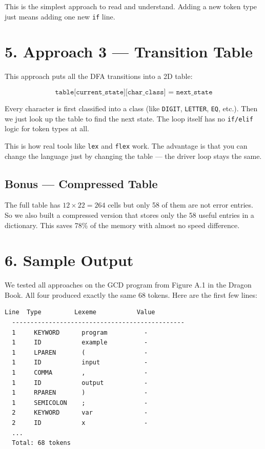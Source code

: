 \documentclass[12pt, a4paper]{article}
\begin{document}
This is the simplest approach to read and understand.
Adding a new token type just means adding one new \texttt{if} line.

\section*{5. Approach 3 — Transition Table}

This approach puts all the DFA transitions into a 2D table:

\[
\texttt{table[current\_state][char\_class] = next\_state}
\]

Every character is first classified into a class (like
\texttt{DIGIT}, \texttt{LETTER}, \texttt{EQ}, etc.).
Then we just look up the table to find the next state.
The loop itself has no \texttt{if/elif} logic for token types at all.

This is how real tools like \texttt{lex} and \texttt{flex} work.
The advantage is that you can change the language just by changing
the table — the driver loop stays the same.

\subsection*{Bonus — Compressed Table}

The full table has $12 \times 22 = 264$ cells but only 58 of them
are not error entries. So we also built a compressed version that
stores only the 58 useful entries in a dictionary.
This saves 78\% of the memory with almost no speed difference.

\section*{6. Sample Output}

We tested all approaches on the GCD program from Figure A.1 in
the Dragon Book. All four produced exactly the same 68 tokens.
Here are the first few lines:

\begin{lstlisting}[language={}]
  Line  Type         Lexeme           Value
  -----------------------------------------------
  1     KEYWORD      program          -
  1     ID           example          -
  1     LPAREN       (                -
  1     ID           input            -
  1     COMMA        ,                -
  1     ID           output           -
  1     RPAREN       )                -
  1     SEMICOLON    ;                -
  2     KEYWORD      var              -
  2     ID           x                -
  ...
  Total: 68 tokens
\end{lstlisting}
\end{document}
